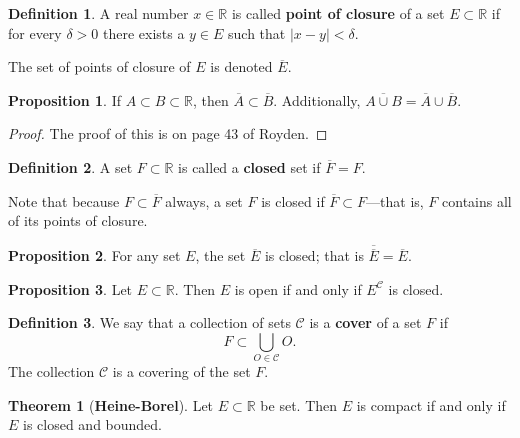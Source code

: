 \documentclass[12pt]{article}
\newcommand{\R}{\mathbb{R}}
\newcommand{\C}{\mathscr{C}}
\theoremstyle{definition}
\newtheorem*{thm}{Theorem}
\newtheorem*{definition}{Definition}
\newtheorem{prop}{Proposition}
\begin{document}
\begin{definition}
    A real number \( x \in \R \) is called \textbf{point of closure} of a set \( E \subset \R \) if for every \( \delta > 0 \) there exists a \( y \in E \) such that \( |x - y| < \delta \).

    The set of points of closure of \( E \) is denoted \( \overline{E} \).
\end{definition}

\begin{prop}
    If \( A \subset B \subset \R \), then \( \overline{A} \subset \overline{B} \). Additionally, \( \overline{A \cup B } = \overline{A} \cup \overline{B} \).

        \begin{proof}
            The proof of this is on page 43 of Royden.
        \end{proof}
\end{prop}

\begin{definition}
    A set \( F \subset \R \) is called a \textbf{closed} set if \( \overline{F} = F \).
\end{definition}

Note that because \( F  \subset \overline{F} \) always, a set \( F \) is closed if \( \overline{F} \subset F \)---that is, \( F \) contains all of its points of closure.

\begin{prop}
    For any set \( E \), the set \( \overline{E} \) is closed; that is \( \overline{\overline{E}} = \overline{E} \).
\end{prop}

\begin{prop}
    Let \( E \subset \R \). Then \( E \) is open if and only if \( E^{\C} \) is closed.
\end{prop}

\begin{definition}
    We say that a collection of sets \( \C \) is a \textbf{cover} of a set \( F \) if 
        \[
            F \subset \bigcup_{O \in \C} O.  
        \]
    The collection \( \C \) is a covering of the set \( F \).
\end{definition}

\begin{thm}[\textbf{Heine-Borel}]

    Let \( E \subset \R \) be set. Then \( E \) is compact if and only if \( E \) is closed and bounded.
    
\end{thm}
\end{document}
